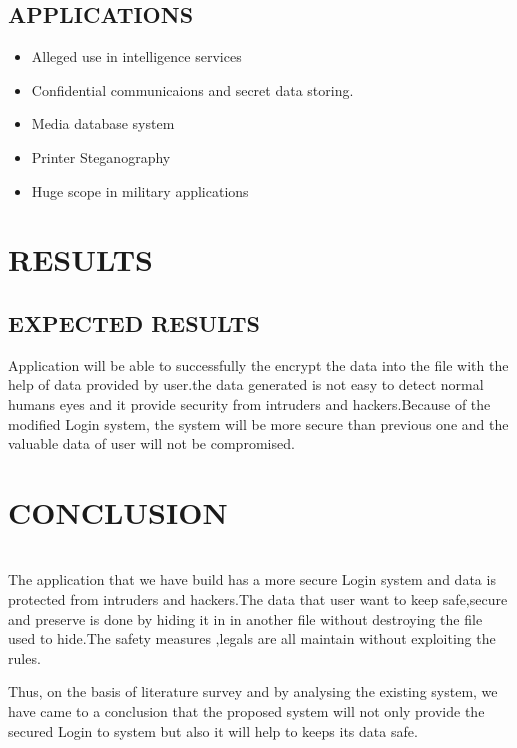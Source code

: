 \documentclass[12pt]{extreport}
\begin{document}
 \section{APPLICATIONS}
\begin{itemize}

\item Alleged use in intelligence services
\item Confidential communicaions and secret data storing.
\item Media database system
\item Printer Steganography
\item Huge scope in military applications
\end{itemize}
\chapter{RESULTS}
\section{EXPECTED RESULTS}
\hspace*{5em}Application will be able to successfully the encrypt the data into the file with the help of data provided by user.the data generated is not easy to detect normal humans eyes and it provide security from intruders and hackers.Because of the modified Login system, the system will be more secure than previous one and the valuable data of user will not be compromised.

\chapter{CONCLUSION}
\hspace*{5em}\\The application that we have build has a more secure Login system and data is protected from intruders and hackers.The data that user want to keep safe,secure and preserve is done by hiding it in in another file without destroying the file used to hide.The safety measures ,legals are all maintain without exploiting the rules.

Thus, on the basis of literature survey and by analysing the existing system, we have came to a conclusion that the proposed system will not only provide the secured Login to system but also it will help to keeps its data safe.
\end{document}
